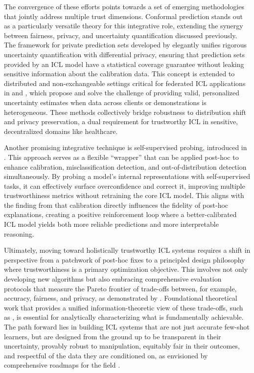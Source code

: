 \documentclass[11pt]{article}
\begin{document}
The convergence of these efforts points towards a set of emerging methodologies that jointly address multiple trust dimensions. Conformal prediction stands out as a particularly versatile theory for this integrative role, extending the synergy between fairness, privacy, and uncertainty quantification discussed previously. The framework for private prediction sets developed by \cite{ref489} elegantly unifies rigorous uncertainty quantification with differential privacy, ensuring that prediction sets provided by an ICL model have a statistical coverage guarantee without leaking sensitive information about the calibration data. This concept is extended to distributed and non-exchangeable settings critical for federated ICL applications in \cite{ref490} and \cite{ref491}, which propose and solve the challenge of providing valid, personalized uncertainty estimates when data across clients or demonstrations is heterogeneous. These methods collectively bridge robustness to distribution shift and privacy preservation, a dual requirement for trustworthy ICL in sensitive, decentralized domains like healthcare.

Another promising integrative technique is self-supervised probing, introduced in \cite{ref492}. This approach serves as a flexible ``wrapper'' that can be applied post-hoc to enhance calibration, misclassification detection, and out-of-distribution detection simultaneously. By probing a model's internal representations with self-supervised tasks, it can effectively surface overconfidence and correct it, improving multiple trustworthiness metrics without retraining the core ICL model. This aligns with the finding from \cite{ref493} that calibration directly influences the fidelity of post-hoc explanations, creating a positive reinforcement loop where a better-calibrated ICL model yields both more reliable predictions and more interpretable reasoning.

Ultimately, moving toward holistically trustworthy ICL systems requires a shift in perspective from a patchwork of post-hoc fixes to a principled design philosophy where trustworthiness is a primary optimization objective. This involves not only developing new algorithms but also embracing comprehensive evaluation protocols that measure the Pareto frontier of trade-offs between, for example, accuracy, fairness, and privacy, as demonstrated by \cite{ref494}. Foundational theoretical work that provides a unified information-theoretic view of these trade-offs, such as \cite{ref495}, is essential for analytically characterizing what is fundamentally achievable. The path forward lies in building ICL systems that are not just accurate few-shot learners, but are designed from the ground up to be transparent in their uncertainty, provably robust to manipulation, equitably fair in their outcomes, and respectful of the data they are conditioned on, as envisioned by comprehensive roadmaps for the field \cite{ref496,ref497}.
\end{document}

